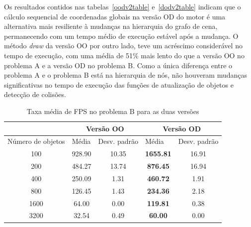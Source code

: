 Os resultados contidos nas tabelas~\ref{oodv2table} 
e~\ref{dodv2table} indicam que o cálculo sequencial de coordenadas 
globais na versão OD do motor é uma alternativa mais resiliente à 
mudanças na hierarquia do grafo de cena, permanecendo com um tempo 
médio de execução estável após a mudança. O método \textit{draw}
da versão OO por outro lado, teve um acréscimo considerável no 
tempo de execução, com uma média de 51\% mais lento do que a 
versão OO no problema A e a versão OD no problema B. Como a única 
diferença entre o problema A e o problema B está na hierarquia de 
nós, não houveram mudanças significativas no tempo de execução 
das funções de atualização de objetos e detecção de colisões.

\newpage

\begin{table}[h!]
\centering
\caption{Taxa média de FPS no problema B para as duas versões}
\label{fpsv2table}
\begin{tabular}{c|cc|cc}
\cline{2-5}
                                       & \multicolumn{2}{c|}{Versão OO}                                & \multicolumn{2}{c}{Versão OD}                                \\ \hline
\multicolumn{1}{l|}{Número de objetos} & \multicolumn{1}{l}{Média} & \multicolumn{1}{l|}{Desv. padrão} & \multicolumn{1}{l}{Média} & \multicolumn{1}{l}{Desv. padrão} \\ \hline
100                                    & 928.90                    & 10.35                             & \textbf{1655.81}          & 16.91                            \\ \hline
200                                    & 484.27                    & 13.74                             & \textbf{876.45}           & 16.94                            \\ \hline
400                                    & 250.09                    & 1.31                              & \textbf{460.72}           & 1.91                             \\ \hline
800                                    & 126.45                    & 1.43                              & \textbf{234.36}           & 2.18                             \\ \hline
1600                                   & 64.00                     & 0.00                              & \textbf{119.81}           & 0.38                             \\ \hline
3200                                   & 32.54                     & 0.49                              & \textbf{60.00}            & 0.00                             \\ \hline
\end{tabular}
\end{table}


